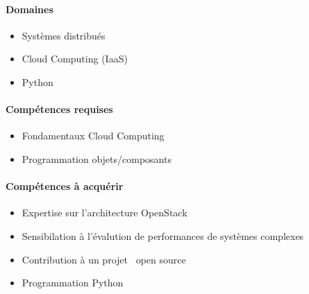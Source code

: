 \documentclass[a4paper,11pt]{article}
\begin{document}
%

\begin{note}


\paragraph*{Domaines}

\begin{itemize}
 \item Systèmes distribués
 \item Cloud Computing (IaaS)
 \item Python
\end{itemize}

\paragraph*{Compétences requises}

\begin{itemize}
 \item Fondamentaux Cloud Computing
 \item Programmation objets/composants
\end{itemize}

\paragraph*{Compétences à acquérir}

\begin{itemize}
\item Expertise sur l'architecture OpenStack
\item Sensibilation à l'évalution de performances de systèmes complexes
\item Contribution à un projet \og~open source~\fg
\item Programmation Python
\end{itemize}


\end{note}
\end{document}
